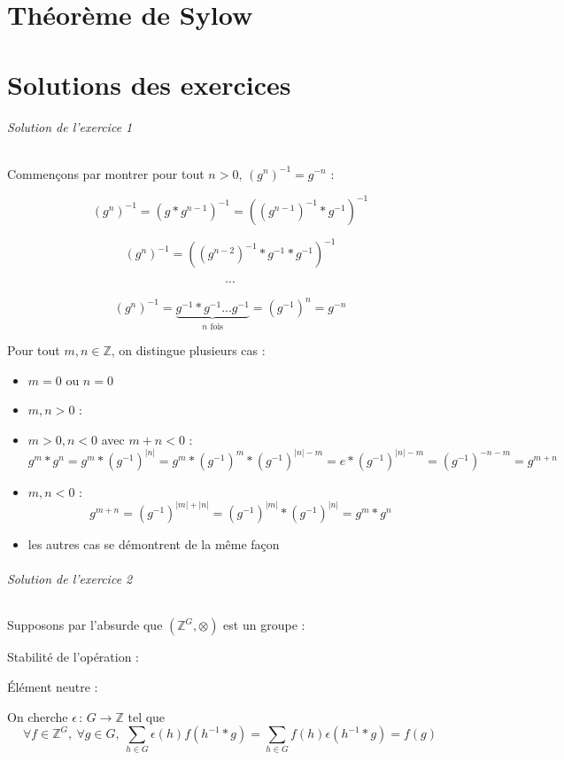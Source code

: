 \documentclass[]{article}
\theoremstyle{remark}
\theoremstyle{definition}
\newcommand{\funcshort}[3]{
#1 \, : \, #2 \longrightarrow #3
}
\begin{document}
\part{Théorème de Sylow}

\part{Solutions des exercices}

\paragraph{Solution de l'exercice 1}

Commençons par montrer pour tout $n > 0$, $( g^n )^{-1} = g^{-n}$ :

$$\left( g^n \right)^{-1} = (g * g^{n-1})^{-1} = ((g^{n-1})^{-1}*g^{-1})^{-1}$$

$$\left( g^n \right)^{-1} = ((g^{n-2})^{-1}*g^{-1}*g^{-1})^{-1}$$

$$\cdots$$

$$\left( g^n \right)^{-1} = \underbrace{g^{-1}*g^{-1} ... g^{-1}}_{n \text{ fois}} = (g^{-1})^n = g^{-n}$$

Pour tout $m, n \in \mathbb{Z}$, on distingue plusieurs cas :
\begin{itemize}
	\item $m = 0$ ou $n = 0$ \checkmark
	\item $m, n > 0$ : \checkmark
	\item $m > 0, n < 0$ avec $m + n < 0$ : $$g^m * g^n = g^m * \left(g^{-1}\right)^{|n|} = g^m*\left(g^{-1}\right)^m*\left(g^{-1}\right)^{|n| - m} = e * \left(g^{-1}\right)^{|n|-m}=\left(g^{-1}\right)^{-n-m}=g^{m+n}$$
	\item $m, n < 0$ : $$g^{m+n}=\left(g^{-1}\right)^{|m|+|n|}=\left(g^{-1}\right)^{|m|}*\left(g^{-1}\right)^{|n|}=g^m*g^n$$
	\item les autres cas se démontrent de la même façon
\end{itemize}

\paragraph{Solution de l'exercice 2}

Supposons par l'absurde que $\left(\mathbb{Z}^G, \otimes\right)$ est un groupe :

\subparagraph{Stabilité de l'opération :} \checkmark

\subparagraph{Élément neutre :} On cherche $\funcshort{\epsilon}{G}{\mathbb{Z}}$ tel que
$$\forall f \in \mathbb{Z}^G, ~ \forall g \in G, ~ \sum_{h \in G}\epsilon(h)f(h^{-1}*g)=\sum_{h \in G}f(h)\epsilon(h^{-1}*g)=f(g)$$
\end{document}
